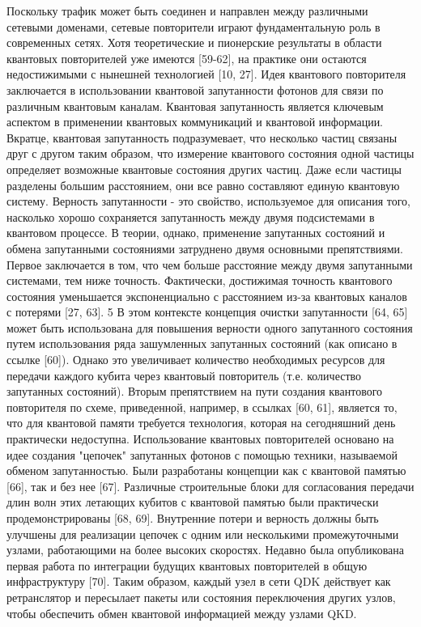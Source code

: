 Поскольку трафик может быть соединен и направлен между различными сетевыми доменами, сетевые повторители играют фундаментальную роль в современных сетях. Хотя теоретические и пионерские результаты в области квантовых повторителей уже имеются [59-62], на практике они остаются недостижимыми с нынешней технологией [10, 27]. Идея квантового повторителя заключается в использовании квантовой запутанности фотонов для связи по различным квантовым каналам. Квантовая запутанность является ключевым аспектом в применении квантовых коммуникаций и квантовой информации. Вкратце, квантовая запутанность подразумевает, что несколько частиц связаны друг с другом таким образом, что измерение квантового состояния одной частицы определяет возможные квантовые состояния других частиц. Даже если частицы разделены большим расстоянием, они все равно составляют единую квантовую систему. Верность запутанности - это свойство, используемое для описания того, насколько хорошо сохраняется запутанность между двумя подсистемами в квантовом процессе.
В теории, однако, применение запутанных состояний и обмена запутанными состояниями затруднено двумя основными препятствиями. Первое заключается в том, что чем больше расстояние между двумя запутанными системами, тем ниже точность. Фактически, достижимая точность квантового состояния уменьшается экспоненциально с расстоянием из-за квантовых каналов с потерями [27, 63]. 5 В этом контексте концепция очистки запутанности [64, 65] может быть использована для повышения верности одного запутанного состояния путем использования ряда зашумленных запутанных состояний (как описано в ссылке [60]). Однако это увеличивает количество необходимых ресурсов для передачи каждого кубита через квантовый повторитель (т.е. количество запутанных состояний). Вторым препятствием на пути создания квантового повторителя по схеме, приведенной, например, в ссылках [60, 61], является то, что для квантовой памяти требуется технология, которая на сегодняшний день практически недоступна. Использование квантовых повторителей основано на идее создания "цепочек" запутанных фотонов с помощью техники, называемой обменом запутанностью. Были разработаны концепции как с квантовой памятью [66], так и без нее [67]. Различные строительные блоки для согласования передачи длин волн этих летающих кубитов с квантовой памятью были практически продемонстрированы [68, 69]. Внутренние потери и верность должны быть улучшены для реализации цепочек с одним или несколькими промежуточными узлами, работающими на более высоких скоростях. Недавно была опубликована первая работа по интеграции будущих квантовых повторителей в общую инфраструктуру [70]. Таким образом, каждый узел в сети QDK действует как ретранслятор и пересылает пакеты или состояния переключения других узлов, чтобы обеспечить обмен квантовой информацией между узлами QKD.

